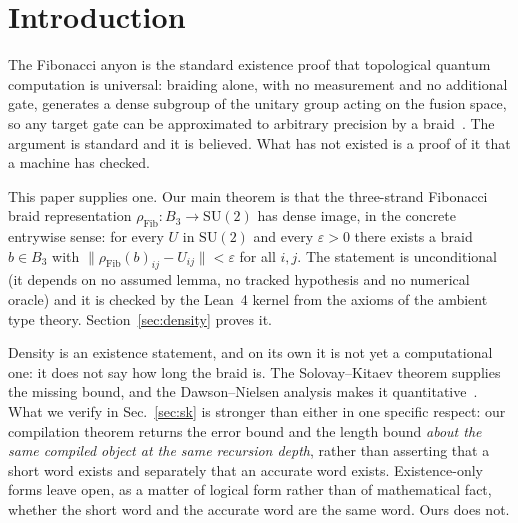 \documentclass[aps,prx,nofootinbib,superscriptaddress,12pt]{revtex4-2}
\begin{document}
\maketitle

\tableofcontents

\section{Introduction}
\label{sec:intro}

The Fibonacci anyon is the standard existence proof that topological
quantum computation is universal: braiding alone, with no measurement
and no additional gate, generates a dense subgroup of the unitary group
acting on the fusion space, so any target gate can be approximated to
arbitrary precision by a braid~\cite{FreedmanLarsenWang2002,
NayakSimonSternFreedmanDasSarma2008}. The argument is standard and it is
believed. What has not existed is a proof of it that a machine has
checked.

This paper supplies one. Our main theorem is that the three-strand
Fibonacci braid representation
$\rho_{\mathrm{Fib}} \colon B_3 \to \mathrm{SU}(2)$ has dense image, in
the concrete entrywise sense: for every $U$ in $\mathrm{SU}(2)$ and every
$\varepsilon > 0$ there exists a braid $b \in B_3$ with
$\lVert \rho_{\mathrm{Fib}}(b)_{ij} - U_{ij}\rVert < \varepsilon$ for all
$i,j$. The statement is unconditional (it depends on no assumed
lemma, no tracked hypothesis and no numerical oracle) and it is
checked by the Lean~4 kernel from the axioms of the ambient type theory.
Section~\ref{sec:density} proves it.

Density is an existence statement, and on its own it is not yet a
computational one: it does not say how long the braid is. The
Solovay--Kitaev theorem supplies the missing bound, and the
Dawson--Nielsen analysis makes it
quantitative~\cite{KitaevShenVyalyi2002,DawsonNielsen2006}. What we
verify in Sec.~\ref{sec:sk} is stronger than either in one specific
respect: our compilation theorem returns the error bound and the length
bound \emph{about the same compiled object at the same recursion depth},
rather than asserting that a short word exists and separately that an
accurate word exists. Existence-only forms leave open, as a matter of
logical form rather than of mathematical fact, whether the short word
and the accurate word are the same word. Ours does not.
\end{document}
